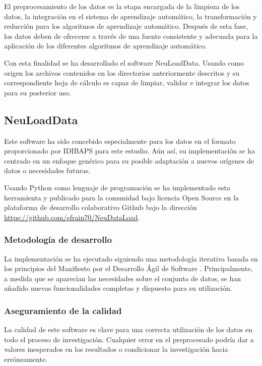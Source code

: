 El preprocesamiento de los datos es la etapa encargada de la limpieza de los datos, la integración en el sistema de aprendizaje automático, la transformación y reducción para los algoritmos de aprendizaje automático. Después de esta fase, los datos deben de ofrecerse a través de una fuente consistente y adecuada para la aplicación de los diferentes algoritmos de aprendizaje automático.

Con esta finalidad se ha desarrollado el software NeuLoadData. Usando como origen los archivos contenidos en los directorios anteriormente descritos y su correspondiente hoja de cálculo es capaz de limpiar, validar e integrar los datos para su posterior uso.

\subsection{NeuLoadData}
Este software ha sido concebido especialmente para los datos en el formato proporcionado por IDIBAPS para este estudio. Aún así, su implementación se ha centrado en un enfoque genérico para su posible adaptación a nuevos orígenes de datos o necesidades futuras.

Usando Python como lenguaje de programación se ha implementado esta herramienta y publicado para la comunidad bajo licencia Open Source en la plataforma de desarrollo colaborativo Github \cite{WhatGitHub} bajo la dirección \url{https://github.com/efrain70/NeuDataLoad}.

\subsubsection{Metodología de desarrollo}

La implementación se ha ejecutado siguiendo una metodología iterativa basada en los principios del Manifiesto por el Desarrollo Ágil de Software \cite{ManifiestoSoftware}. Principalmente, a medida que se aparecían las necesidades sobre el conjunto de datos, se han añadido nuevas funcionalidades completas y dispuesto para su utilización.

\subsubsection{Aseguramiento de la calidad}
La calidad de este software es clave para una correcta utilización de los datos en todo el proceso de investigación. Cualquier error en el preprocesado podría dar a valores inesperados en los resultados o condicionar la investigación hacia erróneamente.

